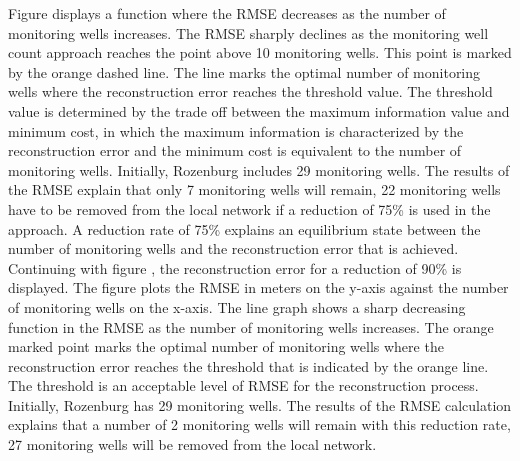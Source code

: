 \newpage
Figure  displays a function where the RMSE decreases as the number of monitoring wells increases. The RMSE sharply declines as the monitoring well count approach reaches the point above 10 monitoring wells. This point is marked by the orange dashed line. The line marks the optimal number of monitoring wells where the reconstruction error reaches the threshold value. The threshold value is determined by the trade off between the maximum information value and minimum cost, in which the maximum information is characterized by the reconstruction error and the minimum cost is equivalent to the number of monitoring wells. Initially, Rozenburg includes 29 monitoring wells. The results of the RMSE explain that only 7 monitoring wells will remain, 22 monitoring wells have to be removed from the local network if a reduction of 75\% is used in the approach. A reduction rate of 75\% explains an equilibrium state between the number of monitoring wells and the reconstruction error that is achieved.
\newline
Continuing with figure , the reconstruction error for a reduction of 90\% is displayed. The figure plots the RMSE in meters on the y-axis against the number of monitoring wells on the x-axis. The line graph shows a sharp decreasing function in the RMSE as the number of monitoring wells increases. The orange marked point marks the optimal number of monitoring wells where the reconstruction error reaches the threshold that is indicated by the orange line. The threshold is an acceptable level of RMSE for the reconstruction process. Initially, Rozenburg has 29 monitoring wells. The results of the RMSE calculation explains that a number of 2 monitoring wells will remain with this reduction rate, 27 monitoring wells will be removed from the local network. 



